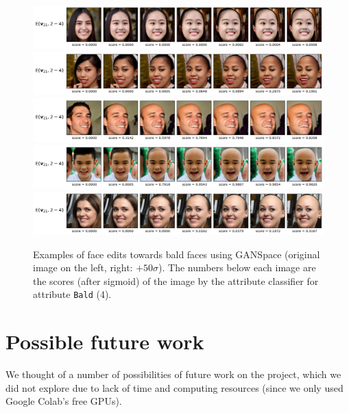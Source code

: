 \documentclass[a4paper]{article}
\begin{document}
\begin{figure}[hbt!]
    \centering
    \includegraphics[width=\hsize]{fig/DiscriBias1.png}
    \includegraphics[width=\hsize]{fig/DiscriBias2.png}
    \includegraphics[width=\hsize]{fig/DiscriBias3.png}
    \includegraphics[width=\hsize]{fig/DiscriBias4.png}
    \includegraphics[width=\hsize]{fig/DiscriBias5.png}
    \caption{Examples of face edits towards bald faces using GANSpace (original image on the left, right: $+50\sigma$). The numbers below each image are the scores (after sigmoid) of the image by the attribute classifier for attribute \texttt{Bald} (4).}
    \label{fig:discri_bias}
\end{figure}

\section{Possible future work}

We thought of a number of possibilities of future work on the project, which we did not explore due to lack of time and computing resources (since we only used Google Colab's free GPUs).
\end{document}
